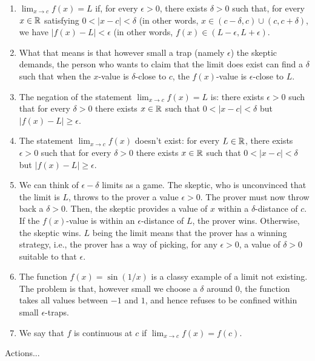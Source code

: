 \documentclass[10pt]{amsart}
\begin{document}
\begin{enumerate}
\item $\lim_{x \to c} f(x) = L$ if, for every $\epsilon > 0$, there
  exists $\delta > 0$ such that, for every $x \in \mathbb{R}$ satisfying $0 <
  |x - c| < \delta$ (in other words, $x \in (c-\delta,c) \cup
  (c,c+\delta)$, we have $|f(x) - L| < \epsilon$ (in other words,
  $f(x) \in (L - \epsilon,L+\epsilon)$.
\item What that means is that however small a trap (namely $\epsilon$)
  the skeptic demands, the person who wants to claim that the limit
  does exist can find a $\delta$ such that when the $x$-value is
  $\delta$-close to $c$, the $f(x)$-value is $\epsilon$-close to $L$.
\item The negation of the statement $\lim_{x \to c} f(x) = L$ is: there
  exists $\epsilon > 0$ such that for every $\delta > 0$ there exists
  $x \in \mathbb{R}$ such that $0 < |x - c| < \delta$ but $|f(x) - L| \ge
  \epsilon$.
\item The statement $\lim_{x \to c} f(x)$ doesn't exist: for every $L
  \in \mathbb{R}$, there exists $\epsilon > 0$ such that for every $\delta >
  0$ there exists $x \in \mathbb{R}$ such that $0 < |x - c| < \delta$ but
  $|f(x) - L| \ge \epsilon$.
\item We can think of $\epsilon-\delta$ limits as a game. The skeptic,
  who is unconvinced that the limit is $L$, throws to the prover a
  value $\epsilon > 0$. The prover must now throw back a $\delta >
  0$. Then, the skeptic provides a value of $x$ within a
  $\delta$-distance of $c$. If the $f(x)$-value is within an
  $\epsilon$-distance of $L$, the prover wins. Otherwise, the skeptic
  wins. $L$ being the limit means that the prover has a winning
  strategy, i.e., the prover has a way of picking, for any $\epsilon >
  0$, a value of $\delta > 0$ suitable to that $\epsilon$.
\item The function $f(x) = \sin(1/x)$ is a classy
  example of a limit not existing. The problem is that, however small
  we choose a $\delta$ around $0$, the function takes all values
  between $-1$ and $1$, and hence refuses to be confined within small
  $\epsilon$-traps.
\item We say that $f$ is continuous at $c$ if $\lim_{x \to c} f(x) =
  f(c)$.
\end{enumerate}

Actions...
\end{document}
